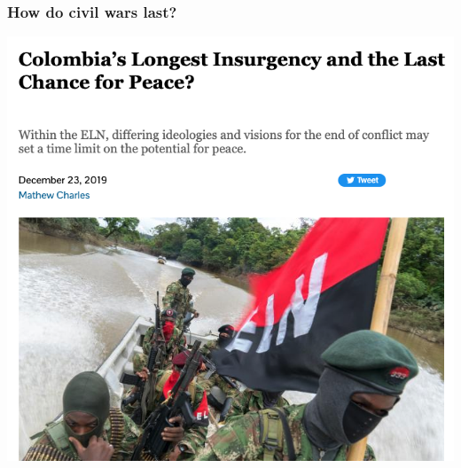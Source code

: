 \documentclass[aspectratio=43]{beamer}
\begin{document}
\begin{frame}
\frametitle{How  do civil wars last?}
\centering

\includegraphics[width = \textwidth]{img/colombia_duration}

\end{frame}
\end{document}
